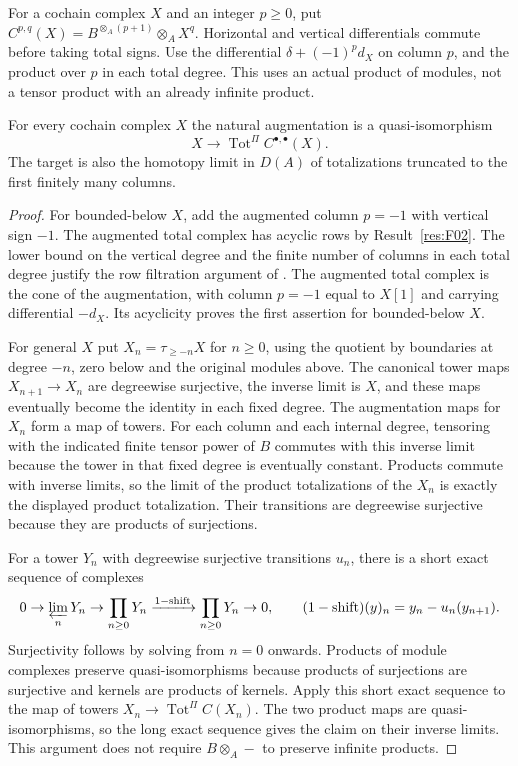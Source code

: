For a cochain complex \(X\) and an integer \(p\geq0\), put
\(C^{p,q}(X)=B^{\otimes_A(p+1)}\otimes_A X^q\).
Horizontal and vertical differentials commute before taking total
signs. Use the differential \(\delta+(-1)^pd_X\) on column \(p\),
and the product over \(p\) in each total degree.
This uses an actual product of modules, not a tensor product with
an already infinite product.

\begin{theorem}\label{res:F07}
For every cochain complex \(X\) the natural augmentation is a
quasi-isomorphism
\[
       X\longrightarrow \operatorname{Tot}^{\Pi} C^{\bullet,\bullet}(X).
\]
The target is also the homotopy limit in \(D(A)\) of totalizations
truncated to the first finitely many columns.
\end{theorem}
\begin{proof}
For bounded-below \(X\), add the augmented column \(p=-1\) with
vertical sign \(-1\). The augmented total complex has acyclic rows
by Result~\ref{res:F02}. The lower bound on the vertical degree
and the finite number of columns in each total degree justify
the row filtration argument of \cite[B01--B04]{ha-core}. The
augmented total complex is the cone of the augmentation, with
column \(p=-1\) equal to \(X[1]\) and carrying differential \(-d_X\).
Its acyclicity proves the first assertion for bounded-below \(X\).

For general \(X\) put \(X_n=\tau_{\geq-n}X\) for \(n\geq0\), using
the quotient by boundaries at degree \(-n\), zero below and the
original modules above. The canonical tower maps \(X_{n+1}\to X_n\)
are degreewise surjective, the inverse limit is \(X\), and these
maps eventually become the identity in each fixed degree.
The augmentation maps for \(X_n\) form a map of towers.
For each column and each internal degree, tensoring with the indicated
finite tensor power of \(B\) commutes with this inverse limit because
the tower in that fixed degree is eventually constant.
Products commute with inverse limits, so the limit of the product
totalizations of the \(X_n\) is exactly the displayed product
totalization. Their transitions are degreewise surjective because
they are products of surjections.

For a tower \(Y_n\) with degreewise surjective transitions \(u_n\),
there is a short exact sequence of complexes
\[
 0\to\varprojlim_n Y_n\to\prod_{n\geq0}Y_n
 \xrightarrow{1-\mathrm{shift}}\prod_{n\geq0}Y_n\to0,
 \qquad (1-\mathrm{shift})(y)_n=y_n-u_n(y_{n+1}).
\]
Surjectivity follows by solving from \(n=0\) onwards. Products of
module complexes preserve quasi-isomorphisms because products of
surjections are surjective and kernels are products of kernels.
Apply this short exact sequence to the map of towers
\(X_n\to\operatorname{Tot}^{\Pi} C(X_n)\). The two product maps are
quasi-isomorphisms, so the long exact sequence gives the claim on
their inverse limits. This argument does not require \(B\otimes_A-\)
to preserve infinite products.


\end{proof}
